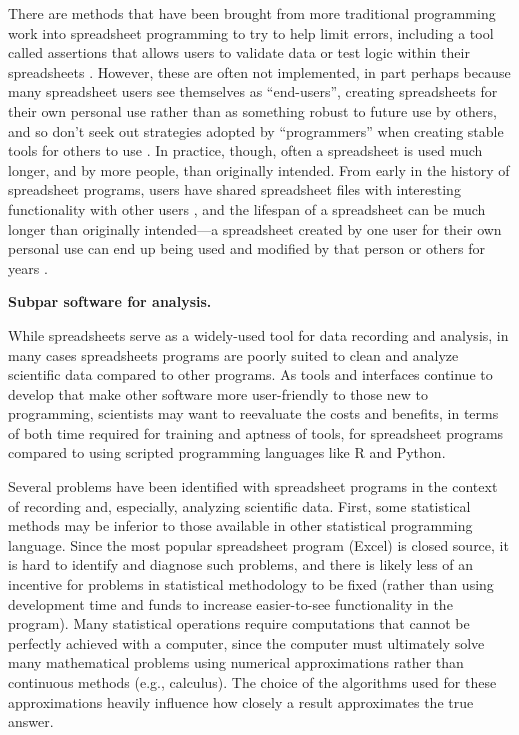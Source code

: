 \documentclass[]{tufte-book}
\begin{document}
There are methods that have been brought from more traditional programming work
into spreadsheet programming to try to help limit errors, including a tool
called assertions that allows users to validate data or test logic within their
spreadsheets \citep{hermans2016spreadsheets}. However, these are often not
implemented, in part perhaps because many spreadsheet users see themselves as
``end-users'', creating spreadsheets for their own personal use rather than as
something robust to future use by others, and so don't seek out strategies
adopted by ``programmers'' when creating stable tools for others to use
\citep{hermans2016spreadsheets}. In practice, though, often a spreadsheet is used
much longer, and by more people, than originally intended. From early in the
history of spreadsheet programs, users have shared spreadsheet files with
interesting functionality with other users \citep{levy1984spreadsheet}, and the
lifespan of a spreadsheet can be much longer than originally intended---a
spreadsheet created by one user for their own personal use can end up being used
and modified by that person or others for years \citep{hermans2016spreadsheets}.

\textbf{Subpar software for analysis.}

While spreadsheets serve as a widely-used tool for data recording and analysis,
in many cases spreadsheets programs are poorly suited to clean and analyze
scientific data compared to other programs. As tools and interfaces continue to
develop that make other software more user-friendly to those new to programming,
scientists may want to reevaluate the costs and benefits, in terms of both time
required for training and aptness of tools, for spreadsheet programs compared to
using scripted programming languages like R and Python.

Several problems have been identified with spreadsheet programs in the context of
recording and, especially, analyzing scientific data. First, some statistical
methods may be inferior to those available in other statistical programming language.
Since the most popular spreadsheet program (Excel) is closed source, it is hard to
identify and diagnose such problems, and there is likely less of an incentive for
problems in statistical methodology to be fixed (rather than using development time
and funds to increase easier-to-see functionality in the program). Many statistical
operations require computations that cannot be perfectly achieved with a
computer, since the computer must ultimately solve many mathematical problems using
numerical approximations rather than continuous methods (e.g., calculus). The choice of
the algorithms used for these approximations heavily influence how closely a result
approximates the true answer.
\end{document}
